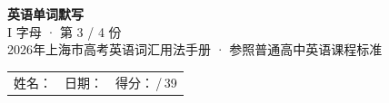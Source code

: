 \documentclass[10pt,a4paper]{article}
\begin{document}
\pagestyle{plain}

\begin{center}
{\LARGE\bfseries 英语单词默写}\\[0.22em]
{\large I 字母 · 第 3 / 4 份}\\[0.18em]
{\small 2026年上海市高考英语词汇用法手册 · 参照普通高中英语课程标准}
\end{center}

\vspace{0.25em}
\noindent\begin{tabular}{@{}p{}@{}p{}@{}p{}@{}}
姓名：\underline{\hspace{2.0cm}} & 日期：\underline{\hspace{2.0cm}} & 得分：\underline{\hspace{1.3cm}}\,/\,39 \\
\end{tabular}

\vspace{0.3em}

\vspace{0.08em}
\end{document}
